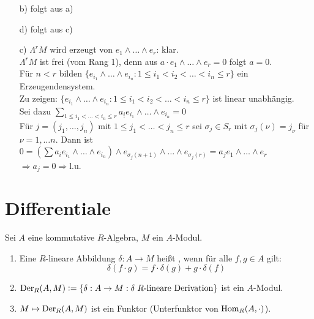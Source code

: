\documentclass[a4paper, 10pt]{report}
\begin{document}
 \begin{Bew}
  \begin{enumerate}
   \item[ b) ] folgt aus a)
   \item[ d) ] folgt aus c)
   \item[ c) ] $\Lambda^rM$ wird erzeugt von $e_1 \wedge \dots \wedge e_r$: klar.\\
 $\Lambda^rM$ ist frei (vom Rang 1), denn aus $a \cdot e_1 \wedge \dots \wedge e_r = 0$ folgt $a=0$. \\
    Für $n<r$ bilden  $\{e_{i_1} \wedge \dots \wedge e_{i_n}: 1 \leq i_1 < i_2 < \dots < i_n \leq r \}$
    ein Erzeugendensystem. \\
    Zu zeigen: $\{e_{i_1} \wedge \dots \wedge e_{i_n}: 1 \leq i_1 < i_2 < \dots < i_n \leq r \}$ ist linear unabh\"angig.\\
 Sei dazu $\sum_{1 \leq i_1 < \dots < i_n \leq r} a_{\underline{i}}e_{i_1} \wedge \dots \wedge e_{i_n} = 0$\\
    F\"ur $j = (j_1, \dots, j_n)$ mit $1 \leq j_1 < \dots < j_n \leq r$ sei $\sigma_j \in S_r$ mit 
    $\sigma_j(\nu) = j_{\nu}$ für $\nu = 1, \dots n$. Dann ist $ 0= (\sum a_i e_{i_1} \wedge \dots \wedge e_{i_n}) \wedge 
    e_{\sigma_j(n+1)}  \wedge \dots \wedge e_{\sigma_j(r) } = a_j e_1 \wedge \dots \wedge e_r$ $\Rightarrow a_j = 0 \Rightarrow $l.u. 
  \end{enumerate}
 \end{Bew}

\section{Differentiale}

\begin{DefBem}
  Sei $A$ eine kommutative $R$-Algebra, $M$ ein $A$-Modul.

  \begin{enumerate}
    \item Eine $R$-lineare Abbildung $\delta: A \to M$ heißt
          , wenn für alle $f,g \in A$ gilt:
          \[\delta(f \cdot g) = f \cdot \delta(g) + g \cdot \delta(f)\]
    \item $\Der[R]{A}{M} \defeqr \{ \delta: A \to M: \delta \;
          R\text{-lineare Derivation}\}$ ist ein $A$-Modul.
    \item $M \mapsto \Der[R]{A}{M}$ ist ein Funktor (Unterfunktor von $\Hom[R]{A}{\cdot}$).
  \end{enumerate}
\end{DefBem}
\end{document}
